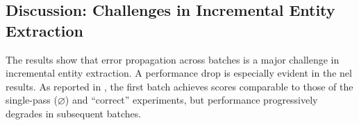\subsection{Discussion: Challenges in Incremental Entity Extraction} \label{sec:futures}








\label{sec:ijckg:discussion}

The results show that error propagation across batches is a major challenge in incremental entity extraction. A performance drop is especially evident in the \ac{nel} results. As reported in , the first batch achieves scores comparable to those of the single-pass ($\varnothing$) and ``correct'' experiments, but performance progressively degrades in subsequent batches.

